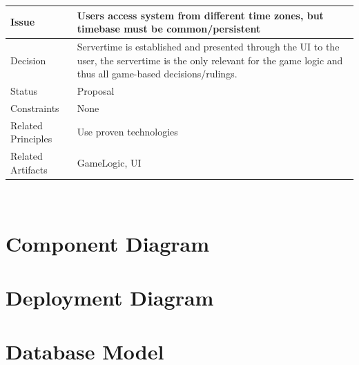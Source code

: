 \documentclass[a4paper]{article}
\begin{document}
\begin{tabular}[t]{|l|p{10cm}|}
\hline
\textbf{Issue}	&	Users access system from different time zones, but timebase must be common/persistent\\
\hline
Decision	&	Servertime is established and presented through the UI to the user, the servertime is the only relevant for the game logic and thus all game-based decisions/rulings.\\
\hline
Status	& Proposal\\
\hline
Constraints	&	None\\
\hline
Related Principles	&	Use proven technologies\\
\hline
Related Artifacts	&	GameLogic, UI\\
\hline
\end{tabular}\\

\clearpage

\section{Component Diagram}


\section{Deployment Diagram}


\section{Database Model}




\end{document}
